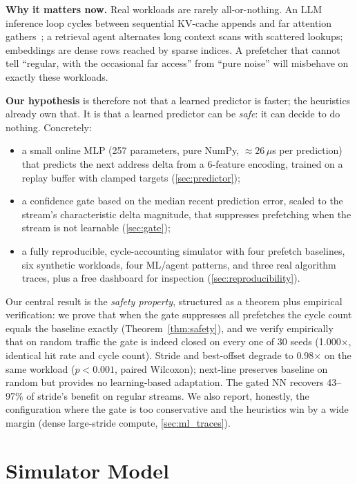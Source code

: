 \documentclass[conference]{IEEEtran}
\begin{document}
\textbf{Why it matters now.}
Real workloads are rarely all-or-nothing. An LLM inference loop cycles between
sequential KV-cache appends and far attention gathers~\cite{kwon2023vllm,pope2023};
a retrieval agent alternates long context scans with scattered lookups; embeddings
are dense rows reached by sparse indices. A prefetcher that cannot tell ``regular,
with the occasional far access'' from ``pure noise'' will misbehave on exactly these
workloads.

\textbf{Our hypothesis} is therefore not that a learned predictor is faster; the
heuristics already own that. It is that a learned predictor can be \emph{safe}: it can
decide to do nothing. Concretely:
\begin{itemize}
\item a small online MLP (257 parameters, pure NumPy, ${\approx}26\,\mu$s per prediction)
that predicts the next address delta from a 6-feature encoding, trained on a replay
buffer with clamped targets (\cref{sec:predictor});
\item a confidence gate based on the median recent prediction error, scaled to the
stream's characteristic delta magnitude, that suppresses prefetching when the stream
is not learnable (\cref{sec:gate});
\item a fully reproducible, cycle-accounting simulator with four prefetch baselines,
six synthetic workloads, four ML/agent patterns, and three real algorithm traces,
plus a free dashboard for inspection (\cref{sec:reproducibility}).
\end{itemize}

Our central result is the \emph{safety property}, structured as a theorem plus
empirical verification: we prove that when the gate suppresses all prefetches the
cycle count equals the baseline exactly (Theorem~\ref{thm:safety}), and we verify
empirically that on random traffic the gate is indeed closed on every one of 30 seeds
(1.000$\times$, identical hit rate and cycle count). Stride and best-offset degrade
to 0.98$\times$ on the same workload ($p < 0.001$, paired Wilcoxon); next-line
preserves baseline on random but provides no learning-based adaptation. The gated
NN recovers 43--97\% of stride's benefit on regular streams. We also report, honestly, the configuration where the gate is too
conservative and the heuristics win by a wide margin (dense large-stride compute,
\cref{sec:ml_traces}).

\section{Simulator Model}
\label{sec:simulator}
\end{document}
